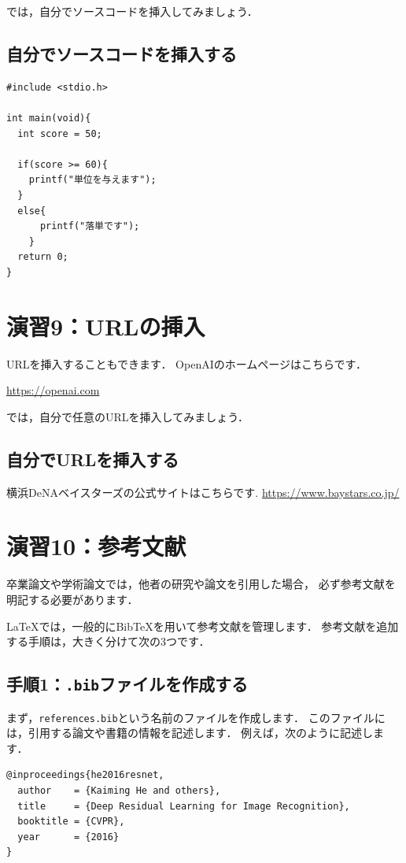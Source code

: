 \documentclass[a4paper,twocolumn]{jsarticle}
\begin{document}
では，自分でソースコードを挿入してみましょう．


\subsection{自分でソースコードを挿入する}
\begin{lstlisting}
#include <stdio.h>

int main(void){
  int score = 50;

  if(score >= 60){
    printf("単位を与えます");
  }
  else{
      printf("落単です");
    }
  return 0;
}
\end{lstlisting}

\section*{演習9：URLの挿入}
URLを挿入することもできます．
OpenAIのホームページはこちらです．

\url{https://openai.com}

では，自分で任意のURLを挿入してみましょう．

\subsection{自分でURLを挿入する}
横浜DeNAベイスターズの公式サイトはこちらです.
\url{https://www.baystars.co.jp/}

\section*{演習10：参考文献}
卒業論文や学術論文では，他者の研究や論文を引用した場合，
必ず参考文献を明記する必要があります．

LaTeXでは，一般的にBibTeXを用いて参考文献を管理します．
参考文献を追加する手順は，大きく分けて次の3つです．

\subsection*{手順1：\texttt{.bib}ファイルを作成する}
まず，\texttt{references.bib}という名前のファイルを作成します．
このファイルには，引用する論文や書籍の情報を記述します．
例えば，次のように記述します．

\begin{lstlisting}[language={}]
@inproceedings{he2016resnet,
  author    = {Kaiming He and others},
  title     = {Deep Residual Learning for Image Recognition},
  booktitle = {CVPR},
  year      = {2016}
}
\end{lstlisting}
\end{document}
